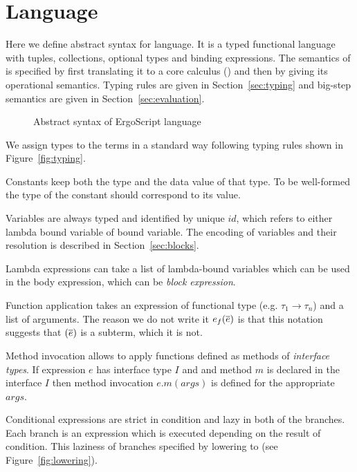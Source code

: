 \section{Language}
\label{sec:language}

Here we define abstract syntax for \langname language. It is a typed
functional language with tuples, collections, optional types and 
binding expressions. The semantics of \langname is specified by first
translating it to a core calculus (\corelang) and then by giving its
operational semantics. Typing rules are given in Section~\ref{sec:typing} and
big-step semantics are given in Section~\ref{sec:evaluation}.

\begin{figure}[h]
    \footnotesize
    
    \caption{Abstract syntax of ErgoScript language}
    \label{fig:language}
\end{figure}
    
We assign types to the terms in a standard way following typing rules shown
in Figure~\ref{fig:typing}.

Constants keep both the type and the data value of that type. To be
well-formed the type of the constant should correspond to its value.

Variables are always typed and identified by unique $id$, which refers to
either lambda bound variable of  bound variable. The encoding of
variables and their resolution is described in Section~\ref{sec:blocks}.

Lambda expressions can take a list of lambda-bound variables which can be
used in the body expression, which can be \emph{block expression}. 

Function application takes an expression of functional type (e.g. $\tau_1 \to
\tau_n$) and a list of arguments. The reason we do not write it $e_f(\overline{e})$
is that this notation suggests that $(\overline{e})$ is a subterm, which it is not.

Method invocation allows to apply functions defined as methods of
\emph{interface types}. If expression $e$ has interface type $I$ and and
method $m$ is declared in the interface $I$ then method invocation
$e.m(args)$ is defined for the appropriate $args$.

Conditional expressions are strict in condition and lazy in both of the
branches. Each branch is an expression which is executed depending on the
result of condition. This laziness of branches specified by lowering to
\corelang (see Figure~\ref{fig:lowering}).

